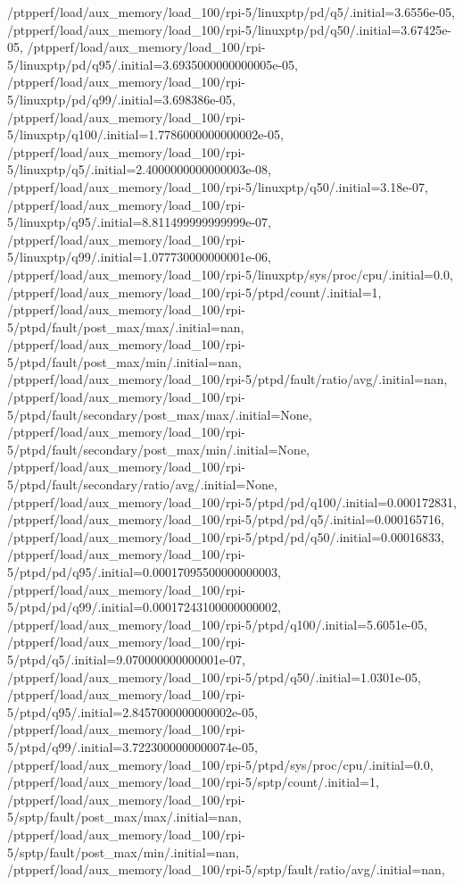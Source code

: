 {    /ptpperf/load/aux_memory/load_100/rpi-5/linuxptp/pd/q5/.initial=3.6556e-05,
    /ptpperf/load/aux_memory/load_100/rpi-5/linuxptp/pd/q50/.initial=3.67425e-05,
    /ptpperf/load/aux_memory/load_100/rpi-5/linuxptp/pd/q95/.initial=3.6935000000000005e-05,
    /ptpperf/load/aux_memory/load_100/rpi-5/linuxptp/pd/q99/.initial=3.698386e-05,
    /ptpperf/load/aux_memory/load_100/rpi-5/linuxptp/q100/.initial=1.7786000000000002e-05,
    /ptpperf/load/aux_memory/load_100/rpi-5/linuxptp/q5/.initial=2.4000000000000003e-08,
    /ptpperf/load/aux_memory/load_100/rpi-5/linuxptp/q50/.initial=3.18e-07,
    /ptpperf/load/aux_memory/load_100/rpi-5/linuxptp/q95/.initial=8.811499999999999e-07,
    /ptpperf/load/aux_memory/load_100/rpi-5/linuxptp/q99/.initial=1.077730000000001e-06,
    /ptpperf/load/aux_memory/load_100/rpi-5/linuxptp/sys/proc/cpu/.initial=0.0,
    /ptpperf/load/aux_memory/load_100/rpi-5/ptpd/count/.initial=1,
    /ptpperf/load/aux_memory/load_100/rpi-5/ptpd/fault/post_max/max/.initial=nan,
    /ptpperf/load/aux_memory/load_100/rpi-5/ptpd/fault/post_max/min/.initial=nan,
    /ptpperf/load/aux_memory/load_100/rpi-5/ptpd/fault/ratio/avg/.initial=nan,
    /ptpperf/load/aux_memory/load_100/rpi-5/ptpd/fault/secondary/post_max/max/.initial=None,
    /ptpperf/load/aux_memory/load_100/rpi-5/ptpd/fault/secondary/post_max/min/.initial=None,
    /ptpperf/load/aux_memory/load_100/rpi-5/ptpd/fault/secondary/ratio/avg/.initial=None,
    /ptpperf/load/aux_memory/load_100/rpi-5/ptpd/pd/q100/.initial=0.000172831,
    /ptpperf/load/aux_memory/load_100/rpi-5/ptpd/pd/q5/.initial=0.000165716,
    /ptpperf/load/aux_memory/load_100/rpi-5/ptpd/pd/q50/.initial=0.00016833,
    /ptpperf/load/aux_memory/load_100/rpi-5/ptpd/pd/q95/.initial=0.00017095500000000003,
    /ptpperf/load/aux_memory/load_100/rpi-5/ptpd/pd/q99/.initial=0.00017243100000000002,
    /ptpperf/load/aux_memory/load_100/rpi-5/ptpd/q100/.initial=5.6051e-05,
    /ptpperf/load/aux_memory/load_100/rpi-5/ptpd/q5/.initial=9.070000000000001e-07,
    /ptpperf/load/aux_memory/load_100/rpi-5/ptpd/q50/.initial=1.0301e-05,
    /ptpperf/load/aux_memory/load_100/rpi-5/ptpd/q95/.initial=2.8457000000000002e-05,
    /ptpperf/load/aux_memory/load_100/rpi-5/ptpd/q99/.initial=3.7223000000000074e-05,
    /ptpperf/load/aux_memory/load_100/rpi-5/ptpd/sys/proc/cpu/.initial=0.0,
    /ptpperf/load/aux_memory/load_100/rpi-5/sptp/count/.initial=1,
    /ptpperf/load/aux_memory/load_100/rpi-5/sptp/fault/post_max/max/.initial=nan,
    /ptpperf/load/aux_memory/load_100/rpi-5/sptp/fault/post_max/min/.initial=nan,
    /ptpperf/load/aux_memory/load_100/rpi-5/sptp/fault/ratio/avg/.initial=nan,
}

